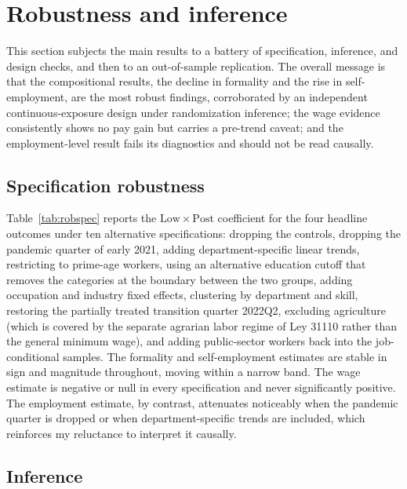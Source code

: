 \section{Robustness and inference}\label{sec:robustness}

This section subjects the main results to a battery of specification, inference, and design checks, and then to an out-of-sample replication. The overall message is that the compositional results, the decline in formality and the rise in self-employment, are the most robust findings, corroborated by an independent continuous-exposure design under randomization inference; the wage evidence consistently shows no pay gain but carries a pre-trend caveat; and the employment-level result fails its diagnostics and should not be read causally.

\subsection{Specification robustness}

Table~\ref{tab:robspec} reports the $\mathrm{Low}\times\mathrm{Post}$ coefficient for the four headline outcomes under ten alternative specifications: dropping the controls, dropping the pandemic quarter of early 2021, adding department-specific linear trends, restricting to prime-age workers, using an alternative education cutoff that removes the categories at the boundary between the two groups, adding occupation and industry fixed effects, clustering by department and skill, restoring the partially treated transition quarter 2022Q2, excluding agriculture (which is covered by the separate agrarian labor regime of Ley 31110 rather than the general minimum wage), and adding public-sector workers back into the job-conditional samples. The formality and self-employment estimates are stable in sign and magnitude throughout, moving within a narrow band. The wage estimate is negative or null in every specification and never significantly positive. The employment estimate, by contrast, attenuates noticeably when the pandemic quarter is dropped or when department-specific trends are included, which reinforces my reluctance to interpret it causally.



\subsection{Inference}

